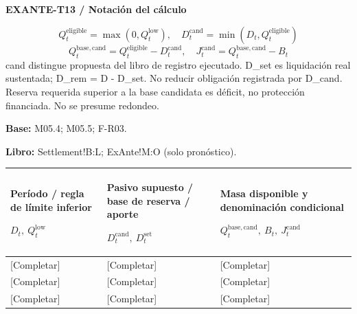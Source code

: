 \par\begingroup\sffamily\fontsize{8}{10}\selectfont\color{NEBGreen}\setlength{\parskip}{2pt}\setlength{\abovedisplayskip}{4pt}\setlength{\belowdisplayskip}{4pt}\setlength{\abovedisplayshortskip}{2pt}\setlength{\belowdisplayshortskip}{3pt}
\textbf{EXANTE-T13 / Notación del cálculo}\par
{\fontsize{9}{11}\selectfont\[ Q_t^{\mathrm{eligible}}=\max(0,Q_t^{\mathrm{low}}),\quad D_t^{\mathrm{cand}}=\min(D_t,Q_t^{\mathrm{eligible}}) \]}
{\fontsize{9}{11}\selectfont\[ Q_t^{\mathrm{base,cand}}=Q_t^{\mathrm{eligible}}-D_t^{\mathrm{cand}},\quad J_t^{\mathrm{cand}}=Q_t^{\mathrm{base,cand}}-B_t \]}
cand distingue propuesta del libro de registro ejecutado. D\_set es liquidación real sustentada; D\_rem = D - D\_set. No reducir obligación registrada por D\_cand. Reserva requerida superior a la base candidata es déficit, no protección financiada. No se presume redondeo.\par
\textbf{Base:} M05.4; M05.5; F-R03.\par
\textbf{Libro:} Settlement!B:L; ExAnte!M:O (solo pronóstico).\par\endgroup
{\sffamily\fontsize{8.3}{10.3}\selectfont\begin{longtable}{@{}P{54.83mm} P{54.83mm} P{54.83mm}@{}}
\toprule
\textbf{Período / regla de límite inferior}\par {\normalfont\fontsize{8.2}{10}\selectfont $D_t,\ Q_t^{\mathrm{low}}$} & \textbf{Pasivo supuesto / base de reserva / aporte}\par {\normalfont\fontsize{8.2}{10}\selectfont $D_t^{\mathrm{cand}},\ D_t^{\mathrm{set}}$} & \textbf{Masa disponible y denominación condicional}\par {\normalfont\fontsize{8.2}{10}\selectfont $Q_t^{\mathrm{base,cand}},\ B_t,\ J_t^{\mathrm{cand}}$}\\\midrule\endhead
\rule{0pt}{8mm}[Completar] & [Completar] & [Completar]\\\hline
\rule{0pt}{8mm}[Completar] & [Completar] & [Completar]\\\hline
\rule{0pt}{8mm}[Completar] & [Completar] & [Completar]\\\hline
\end{longtable}}
